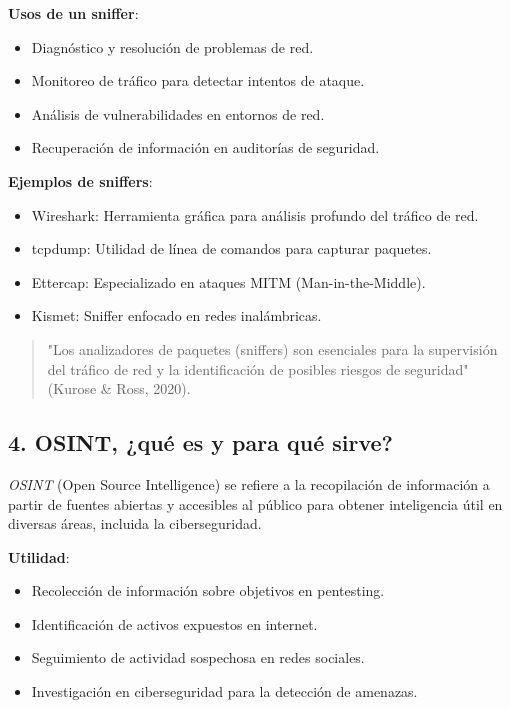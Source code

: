 \textbf{Usos de un sniffer}:
\begin{itemize}
    \item Diagnóstico y resolución de problemas de red.
    \item Monitoreo de tráfico para detectar intentos de ataque.
    \item Análisis de vulnerabilidades en entornos de red.
    \item Recuperación de información en auditorías de seguridad.
\end{itemize}

\textbf{Ejemplos de sniffers}:
\begin{itemize}
    \item Wireshark: Herramienta gráfica para análisis profundo del tráfico de red.
    \item tcpdump: Utilidad de línea de comandos para capturar paquetes.
    \item Ettercap: Especializado en ataques MITM (Man-in-the-Middle).
    \item Kismet: Sniffer enfocado en redes inalámbricas.
\end{itemize}

\begin{quote}
    "Los analizadores de paquetes (sniffers) son esenciales para la supervisión del tráfico de red y la identificación de posibles riesgos de seguridad" (Kurose \& Ross, 2020).
\end{quote}

\subsection{4. OSINT, ¿qué es y para qué sirve?}
\textit{OSINT} (Open Source Intelligence) se refiere a la recopilación de información a partir de fuentes abiertas y accesibles al público para obtener inteligencia útil en diversas áreas, incluida la ciberseguridad.

\textbf{Utilidad}:
\begin{itemize}
    \item Recolección de información sobre objetivos en pentesting.
    \item Identificación de activos expuestos en internet.
    \item Seguimiento de actividad sospechosa en redes sociales.
    \item Investigación en ciberseguridad para la detección de amenazas.
\end{itemize}

